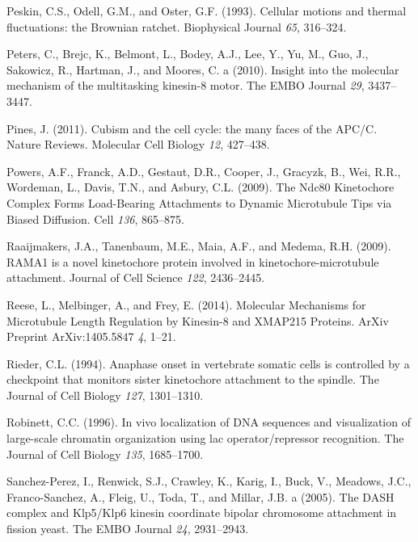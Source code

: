 \documentclass[12pt,a4paper,twoside,openright]{book}
\begin{document}
Peskin, C.S., Odell, G.M., and Oster, G.F. (1993). Cellular motions and
thermal fluctuations: the Brownian ratchet. Biophysical Journal
\emph{65}, 316--324.

Peters, C., Brejc, K., Belmont, L., Bodey, A.J., Lee, Y., Yu, M., Guo,
J., Sakowicz, R., Hartman, J., and Moores, C. a (2010). Insight into the
molecular mechanism of the multitasking kinesin-8 motor. The EMBO
Journal \emph{29}, 3437--3447.

Pines, J. (2011). Cubism and the cell cycle: the many faces of the
APC/C. Nature Reviews. Molecular Cell Biology \emph{12}, 427--438.

Powers, A.F., Franck, A.D., Gestaut, D.R., Cooper, J., Gracyzk, B., Wei,
R.R., Wordeman, L., Davis, T.N., and Asbury, C.L. (2009). The Ndc80
Kinetochore Complex Forms Load-Bearing Attachments to Dynamic
Microtubule Tips via Biased Diffusion. Cell \emph{136}, 865--875.

Raaijmakers, J.A., Tanenbaum, M.E., Maia, A.F., and Medema, R.H. (2009).
RAMA1 is a novel kinetochore protein involved in kinetochore-microtubule
attachment. Journal of Cell Science \emph{122}, 2436--2445.

Reese, L., Melbinger, A., and Frey, E. (2014). Molecular Mechanisms for
Microtubule Length Regulation by Kinesin-8 and XMAP215 Proteins. ArXiv
Preprint ArXiv:1405.5847 \emph{4}, 1--21.

Rieder, C.L. (1994). Anaphase onset in vertebrate somatic cells is
controlled by a checkpoint that monitors sister kinetochore attachment
to the spindle. The Journal of Cell Biology \emph{127}, 1301--1310.

Robinett, C.C. (1996). In vivo localization of DNA sequences and
visualization of large-scale chromatin organization using lac
operator/repressor recognition. The Journal of Cell Biology \emph{135},
1685--1700.

Sanchez-Perez, I., Renwick, S.J., Crawley, K., Karig, I., Buck, V.,
Meadows, J.C., Franco-Sanchez, A., Fleig, U., Toda, T., and Millar, J.B.
a (2005). The DASH complex and Klp5/Klp6 kinesin coordinate bipolar
chromosome attachment in fission yeast. The EMBO Journal \emph{24},
2931--2943.
\end{document}
